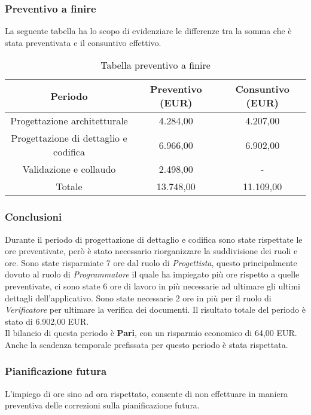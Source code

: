\subsubsection{Preventivo a finire}
La seguente tabella ha lo scopo di evidenziare le differenze tra la somma che è stata preventivata e il consuntivo effettivo.
\begin{table}[h]
	\caption{Tabella preventivo a finire}  
	\begin{center}
		\begin{tabular}{ |c|c|c|  }
			\hline
			Periodo 								& Preventivo (EUR) & Consuntivo (EUR)\\
			\hline\hline
			Progettazione architetturale			& 4.284,00 				& 4.207,00\\
			Progettazione di dettaglio e codifica	& 6.966,00 			& 6.902,00\\
			Validazione e collaudo					& 2.498,00 			& -\\
			\hline\hline
			Totale									& 13.748,00 				& 11.109,00 \\
			\hline
		\end{tabular}
	\end{center}
\end{table}
\subsubsection{Conclusioni}
Durante il periodo di progettazione di dettaglio e codifica sono state rispettate le ore preventivate, però è stato necessario riorganizzare la suddivisione dei ruoli e ore. Sono state risparmiate 7 ore dal ruolo di \textit{Progettista}, questo principalmente dovuto al ruolo di \textit{Programmatore} il quale ha impiegato più ore rispetto a quelle preventivate, ci sono state 6 ore di lavoro in più necessarie ad ultimare gli ultimi dettagli dell’applicativo. Sono state necessarie 2 ore in più per il ruolo di \textit{Verificatore} per ultimare la verifica dei documenti. Il risultato totale del periodo è stato di 6.902,00 EUR.
\\Il bilancio di questa periodo è \textbf{Pari}, con un risparmio economico di 64,00 EUR. Anche la scadenza temporale prefissata per questo periodo è stata rispettata.

\subsubsection{Pianificazione futura}
L'impiego di ore sino ad ora rispettato, consente di non effettuare in maniera preventiva delle correzioni sulla pianificazione futura. 

